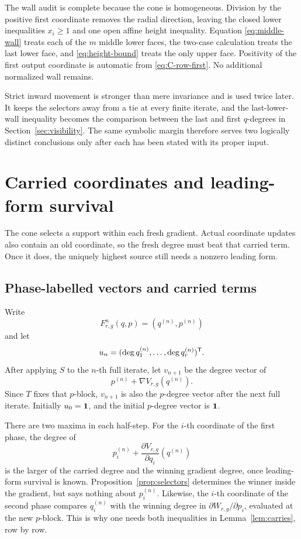 \documentclass[11pt]{article}
\theoremstyle{remark}
\numberwithin{equation}{section}
\begin{document}
The wall audit is complete because the cone is homogeneous.  Division by the
positive first coordinate removes the radial direction, leaving the closed
lower inequalities \(x_i\geq1\) and one open affine height inequality.
Equation \eqref{eq:middle-wall} treats each of the \(m\) middle lower faces,
the two-case calculation treats the last lower face, and
\eqref{eq:height-bound} treats the only upper face.  Positivity of the first
output coordinate is automatic from \eqref{eq:C-row-first}.  No additional
normalized wall remains.

Strict inward movement is stronger than mere invariance and is used twice
later.  It keeps the selectors away from a tie at every finite iterate, and
the last-lower-wall inequality becomes the comparison between the last and
first \(q\)-degrees in Section~\ref{sec:visibility}.  The same symbolic
margin therefore serves two logically distinct conclusions only after each
has been stated with its proper input.

\section{Carried coordinates and leading-form survival}\label{sec:carry}

The cone selects a support within each fresh gradient.  Actual coordinate
updates also contain an old coordinate, so the fresh degree must beat that
carried term.  Once it does, the uniquely highest source still needs a
nonzero leading form.

\subsection{Phase-labelled vectors and carried terms}

Write
\[
F_{r,g}^n(q,p)=(q^{(n)},p^{(n)})
\]
and let
\[
u_n=(\operatorname{deg} q_1^{(n)},\ldots,\operatorname{deg} q_r^{(n)})^{\mathsf{T}}.
\]
After applying \(S\) to the \(n\)-th full iterate, let \(v_{n+1}\) be the
degree vector of
\[
p^{(n)}+\nabla V_{r,g}(q^{(n)}).
\]
Since \(T\) fixes that \(p\)-block, \(v_{n+1}\) is also the \(p\)-degree
vector after the next full iterate.  Initially \(u_0=\mathbf{1}\), and the
initial \(p\)-degree vector is \(\mathbf{1}\).

There are two maxima in each half-step.  For the \(i\)-th coordinate of the
first phase, the degree of
\[
p_i^{(n)}+\frac{\partial V_{r,g}}{\partial q_i}(q^{(n)})
\]
is the larger of the carried degree and the winning gradient degree, once
leading-form survival is known.  Proposition~\ref{prop:selectors} determines
the winner inside the gradient, but says nothing about \(p_i^{(n)}\).
Likewise, the \(i\)-th coordinate of the second phase compares
\(q_i^{(n)}\) with the winning degree in
\(\partial W_{r,g}/\partial p_i\), evaluated at the new \(p\)-block.  This
is why one needs both inequalities in Lemma~\ref{lem:carries}, row by row.
\end{document}
